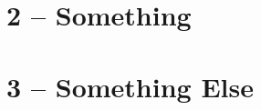 
\clearpage %
\label{chapter:appendix-something} %
\chapter*{\appendixTitle~2 -- Something} %

\clearpage
{}
{}\label{chapter:appendix-something-else}
\chapter*{\appendixTitle~3 -- Something Else}

